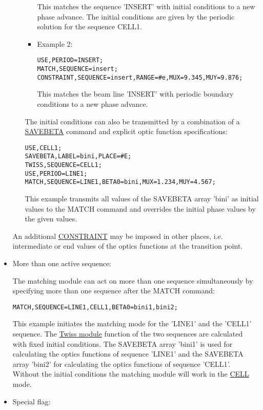 \begin{itemize}
\begin{itemize}
\begin{itemize}
 This matches the sequence 'INSERT' with initial conditions to a new phase
 advance. The initial conditions are given by the periodic solution for
 the sequence CELL1.
 
	\item 
 Example 2:
\begin{verbatim}
USE,PERIOD=INSERT;
MATCH,SEQUENCE=insert;
CONSTRAINT,SEQUENCE=insert,RANGE=#e,MUX=9.345,MUY=9.876;
\end{verbatim}


 This matches the beam line 'INSERT' with periodic boundary conditions to
 a new phase advance.
\end{itemize}
 The initial conditions can also be transmitted by a combination of a \href{../control/general.html#savebeta}{SAVEBETA}
 command and explicit optic function specifications:
 
\begin{verbatim}
USE,CELL1;
SAVEBETA,LABEL=bini,PLACE=#E;
TWISS,SEQUENCE=CELL1;
USE,PERIOD=LINE1;
MATCH,SEQUENCE=LINE1,BETA0=bini,MUX=1.234,MUY=4.567;\end{verbatim}
 This example transmits all values of the SAVEBETA array 'bini' as initial
 values to the MATCH command and overrides the initial phase values by the
 given values.
\end{itemize}
 An additional \href{match_con.html#constraint}{CONSTRAINT}
 may be imposed in other places, i.e. intermediate or end values of the
 optics functions at the transition point.
 
 
	\item 
 More than one active sequence:


The matching module can act on more than one sequence simultaneously
 by specifying more than one sequence after the MATCH command:
 
\begin{verbatim}
MATCH,SEQUENCE=LINE1,CELL1,BETA0=bini1,bini2;\end{verbatim}
 This example initiates the matching mode for the 'LINE1' and the 'CELL1'
 sequence. The \href{../twiss/twiss.html}{Twiss
 module} function of the two sequences are calculated with fixed initial
 conditions. The SAVEBETA array 'bini1' is used for calculating the optics
 functions of sequence 'LINE1' and the SAVEBETA array 'bini2' for calculating
 the optics functions of sequence 'CELL1'. Without the initial conditions
 the matching module will work in the \href{match_main.html#cell}{CELL}
 mode.
 


	\item 
 Special flag:
\end{itemize}



